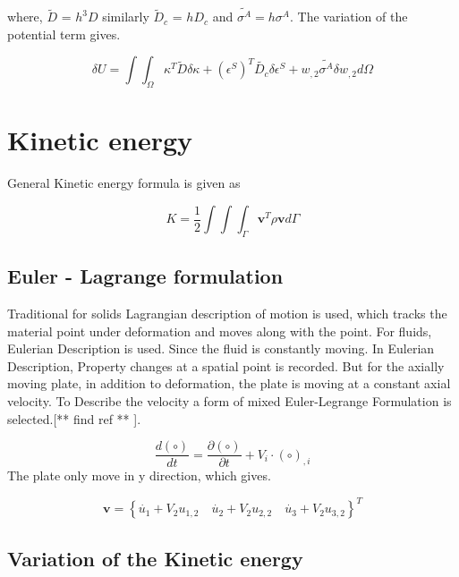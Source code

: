 \documentclass[main.tex]{subfiles}
\begin{document}
where, $\tilde{D}$ = $h^3D$  similarly $\tilde{D}_c$ = $hD_c$ and $\tilde{\sigma^A}=h\sigma^A$. The variation of the potential term gives.


\begin{equation}\label{eq:vr_PE}
\delta U=\int\int_\Omega 
\kappa^T \tilde{D} \delta\kappa 
+ 
\left(\epsilon^S\right)^T \tilde{D_c} \delta\epsilon^S 
+ 
w_{,2} \tilde{\sigma^A} \delta w_{,2} d \Omega
\end{equation}



\section{Kinetic energy}
General Kinetic energy formula is given as

\begin{equation}\label{eq:KE}
K = \frac{1}{2} \int \int \int_{\Gamma} \mathbf{v}^T\rho\mathbf{v} d\Gamma
\end{equation}


\subsection{Euler - Lagrange formulation}


Traditional for solids Lagrangian description of motion is used, which tracks the material point under deformation and moves along with the point. For fluids, Eulerian Description is used. Since the fluid is constantly moving. In Eulerian Description, Property changes at a spatial point is recorded. But for the axially moving plate, in addition to deformation, the plate is moving at a constant axial velocity. To Describe the velocity a form of mixed Euler-Legrange Formulation is selected.[** find ref ** ].


\begin{equation}
\frac{d(\circ)}{dt}=\frac{\partial(\circ)}{\partial t} + V_i \cdot (\circ)_{,i} 
\end{equation}
The plate only move in y direction, which gives.

\begin{equation}\label{eq:v}
  \mathbf{v}=\left\{ \dot{u_1}+V_2u_{1,2} \quad  \dot{u_2}+V_2u_{2,2} \quad  \dot{u_3}+V_2u_{3,2} \right\}^T
\end{equation}
\subsection{Variation of the Kinetic energy}
\end{document}

